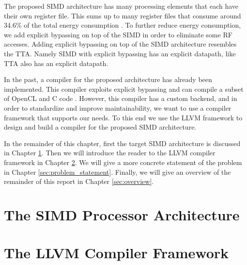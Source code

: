 The proposed SIMD architecture has many processing elements that each have their own register file. This sums up to many register files that consume around 34.6\% of the total energy consumption \cite{dongrio1}. To further reduce energy consumption, we add explicit bypassing on top of the SIMD in order to eliminate some RF accesses. Adding explicit bypassing on top of the SIMD architecture resembles the TTA. Namely SIMD with explicit bypassing has an explicit datapath, like TTA also has an explicit datapath.

In the past, a compiler for the proposed architecture has already been implemented. This compiler exploits explicit bypassing \cite{dongrio1} and can compile a subset of OpenCL and C code \cite{dongrio2}. However, this compiler has a custom backend, and in order to standardize and improve maintainability, we want to use a compiler framework that supports our needs. To this end we use the LLVM framework to design and build a compiler for the proposed SIMD architecture.


In the remainder of this chapter, first the target SIMD architecture is discussed in Chapter \ref{sec:simd}. Then we will introduce the reader to the LLVM compiler framework in Chapter \ref{sec:llvm}. We will give a more concrete statement of the problem in Chapter \ref{sec:problem_statement}. Finally, we will give an overview of the remainder of this report in Chapter \ref{sec:overview}.

\section{The SIMD Processor Architecture}\label{sec:simd}


\section{The LLVM Compiler Framework}\label{sec:llvm}


